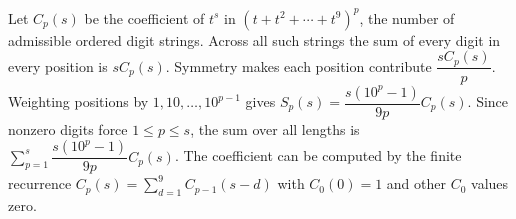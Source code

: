 Let $C_p(s)$ be the coefficient of $t^s$ in $(t+t^2+\cdots+t^9)^p$, the number of admissible ordered digit strings. Across all such strings the sum of every digit in every position is $sC_p(s)$. Symmetry makes each position contribute $\dfrac{sC_p(s)}{p}$. Weighting positions by $1,10,\ldots,10^{p-1}$ gives $\boxed{S_p(s)=\dfrac{s(10^p-1)}{9p}C_p(s)}$. Since nonzero digits force $1\le p\le s$, the sum over all lengths is $\boxed{\sum_{p=1}^s\dfrac{s(10^p-1)}{9p}C_p(s)}$. The coefficient can be computed by the finite recurrence $C_p(s)=\sum_{d=1}^9 C_{p-1}(s-d)$ with $C_0(0)=1$ and other $C_0$ values zero.
